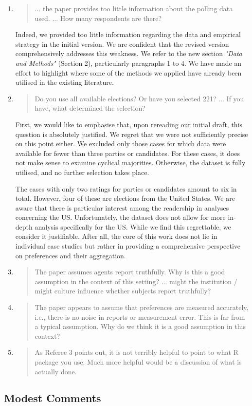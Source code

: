 \documentclass[a4paper, 12pt]{scrartcl}
\begin{document}
\begin{enumerate}[label=(\alph*)] 
	\item
\begin{quote}
$\ldots$ the paper provides too little information about the polling data used. $\ldots$ How many respondents are there?
\end{quote}	
Indeed, we provided too little information regarding the data and empirical strategy in the initial version. We are confident that the revised version comprehensively addresses this weakness. We refer to the new section \textit{"Data and Methods"} (Section 2), particularly paragraphs 1 to 4. We have made an effort to highlight where some of the methods we applied have already been utilised in the existing literature.
\item 
\begin{quote}
	Do you use all available elections? Or have you selected 221? $\ldots$ If you have, what determined the selection?
\end{quote}
First, we would like to emphasise that, upon rereading our initial draft, this question is absolutely justified. We regret that we were not sufficiently precise on this point either. We excluded only those cases for which data were available for fewer than three parties or candidates. For these cases, it does not make sense to examine cyclical majorities. Otherwise, the dataset is fully utilised, and no further selection takes place. 

The cases with only two ratings for parties or candidates amount to six in total. However, four of these are elections from the United States. We are aware that there is particular interest among the readership in analyses concerning the US. Unfortunately, the dataset does not allow for more in-depth analysis specifically for the US. While we find this regrettable, we consider it justifiable. After all, the core of this work does not lie in individual case studies but rather in providing a comprehensive perspective on preferences and their aggregation.
\item \begin{quote}
	The paper assumes agents report truthfully. Why is this a good assumption in the context of this setting? $\ldots$ might the institution / might culture influence whether subjects report truthfully?
\end{quote}


\item \begin{quote}
	The paper appears to assume that preferences are measured accurately, i.e., there is no noise in reports or measurement 	error. This is far from a typical assumption. Why do we think it is a good assumption in this context?
\end{quote}


\item \begin{quote}
	As Referee 3 points out, it is not terribly helpful to point to what R package you use. Much more helpful would be a discussion of what is actually done.
\end{quote}

\end{enumerate}

\subsection*{Modest Comments}


%
%
\end{document}
